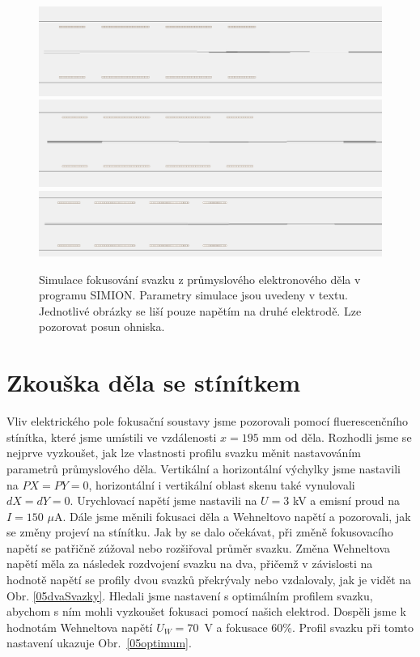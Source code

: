 \begin{figure}[htbp!]
\centering
\includegraphics[width = \textwidth]{Figure/05/1a.jpg}
\vfill
\vspace{0.22cm}
\includegraphics[width = \linewidth]{Figure/05/1b.jpg}
\vfill
\vspace{0.22cm}
\includegraphics[width = \linewidth]{Figure/05/1c.jpg}
\caption{Simulace fokusování svazku z průmyslového elektronového děla v programu SIMION. Parametry simulace jsou uvedeny v textu. Jednotlivé obrázky se liší pouze napětím na druhé elektrodě. Lze pozorovat posun ohniska.}
\label{05simulaceFinalniKonfigurace}
\end{figure}

\section{Zkouška děla se stínítkem}

Vliv elektrického pole fokusační soustavy jsme pozorovali pomocí fluerescenčního stínítka, které jsme umístili ve vzdálenosti $x = 195$ mm od děla. Rozhodli jsme se nejprve vyzkoušet, jak lze vlastnosti profilu svazku měnit nastavováním parametrů průmyslového děla. Vertikální a horizontální výchylky jsme nastavili na $PX = PY = 0$, horizontální i vertikální oblast skenu také vynulovali $dX = dY = 0$. Urychlovací napětí jsme nastavili na $U = 3$ kV a emisní proud na $I = 150$ $\mu$A. Dále jsme měnili fokusaci děla a Wehneltovo napětí a pozorovali, jak se změny projeví na stínítku. Jak by se dalo očekávat, při změně fokusovacího napětí se patřičně zúžoval nebo rozšiřoval průměr svazku. Změna Wehneltova napětí měla za následek rozdvojení svazku na dva, přičemž v závislosti na hodnotě napětí se profily dvou svazků překrývaly nebo vzdalovaly, jak je vidět na Obr. \ref{05dvaSvazky}. Hledali jsme nastavení s optimálním profilem svazku, abychom s ním mohli vyzkoušet fokusaci pomocí našich elektrod. Dospěli jsme k hodnotám Wehneltova napětí $U_W = 70$~V a fokusace 60\%. Profil svazku při tomto nastavení ukazuje Obr.~\ref{05optimum}.\\

